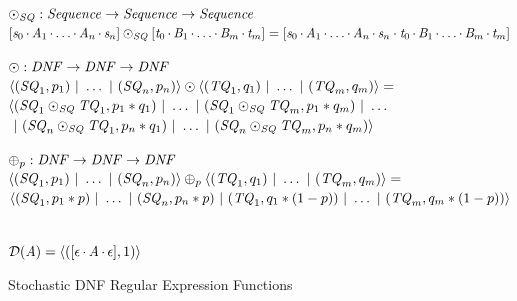 \documentclass[acmsmall,screen,anonymous]{acmart}
\begin{document}
\begin{figure}
  \raggedright
  $\odot_{\mathit{SQ}}{} :{} \mathit{Sequence}{} \rightarrow \mathit{Sequence}{} \rightarrow \mathit{Sequence}{}$\\
  $[\mathit{s}_0\mkern-1mu\cdot\mkern-1mu\mathit{A}_1\mkern-1mu\cdot\mkern-1mu\ldots\mkern-1mu\cdot\mkern-1mu\mathit{A}_n\mkern-1mu\cdot\mkern-1mu\mathit{s}_n]\odot_{\mathit{SQ}}[\mathit{t}_0\mkern-1mu\cdot\mkern-1mu\mathit{B}_1\mkern-1mu\cdot\mkern-1mu\ldots\mkern-1mu\cdot\mkern-1mu\mathit{B}_m\mkern-1mu\cdot\mkern-1mu\mathit{t}_m]=
  [\mathit{s}_0\mkern-1mu\cdot\mkern-1mu\mathit{A}_1\mkern-1mu\cdot\mkern-1mu\ldots\mkern-1mu\cdot\mkern-1mu\mathit{A}_n\mkern-1mu\cdot\mkern-1mu\mathit{s}_n\cdot\mathit{t}_0\mkern-1mu\cdot\mkern-1mu\mathit{B}_1\mkern-1mu\cdot\mkern-1mu\ldots\mkern-1mu\cdot\mkern-1mu\mathit{B}_m\mkern-1mu\cdot\mkern-1mu\mathit{t}_m]$\\

  \medskip
  
  $\odot{} :{} \mathit{DNF}{} \rightarrow \mathit{DNF}{} \rightarrow \mathit{DNF}{}$\\
  $\langle(\mathit{SQ}_1,p_1)~|~\ldots~|~(\mathit{SQ}_n,p_n)\rangle\odot\langle(\mathit{TQ}_1,q_1)~|~\ldots~|~(\mathit{TQ}_m,q_m)\rangle=$\\
      $\langle (\mathit{SQ}_1\odot_{\mathit{SQ}}\mathit{TQ}_1,p_1*q_1)~|~ \ldots
      ~|~
      (\mathit{SQ}_1\odot_{\mathit{SQ}}\mathit{TQ}_m,p_1*q_m)~|~
      \ldots$\\
      $~|~
      (\mathit{SQ}_n\odot_{\mathit{SQ}}\mathit{TQ}_1,p_n*q_1)~|~
      \ldots ~|~
      (\mathit{SQ}_n\odot_{\mathit{SQ}}\mathit{TQ}_m,p_n * q_m) \rangle$
  
  \medskip
  
  $\oplus{}_{p} :{}
  \mathit{DNF}{} \rightarrow \mathit{DNF}{} \rightarrow \mathit{DNF}{}
  $ \\
  $\langle(\mathit{SQ}_1,p_1)~|~\ldots~|~(\mathit{SQ}_n,p_n)\rangle\oplus_{p}\langle(\mathit{TQ}_1,q_1)~|~\ldots~|~(\mathit{TQ}_m,q_m)\rangle =$\\
  $\langle(\mathit{SQ}_1,p_1*p)~|~\ldots~|~(\mathit{SQ}_n,p_n*p)~|~(\mathit{TQ}_1,q_1*(1-p))~|~\ldots~|~(\mathit{TQ}_m,q_m*(1-p))\rangle$
  
  \medskip
  
  \AtomToDNF{} \OfType
  \ArrowTypeOf{\AtomType{}}{\DNFRegexType{}}\\
  $\mathcal{D}(\mathit{A}) = \langle([\epsilon \mkern-1mu\cdot\mkern-1mu \mathit{A} \mkern-1mu\cdot\mkern-1mu
      \epsilon],1)\rangle$
  \caption{Stochastic DNF Regular Expression Functions}
  \label{fig:dnf-regex-functions}
\end{figure}
\end{document}

